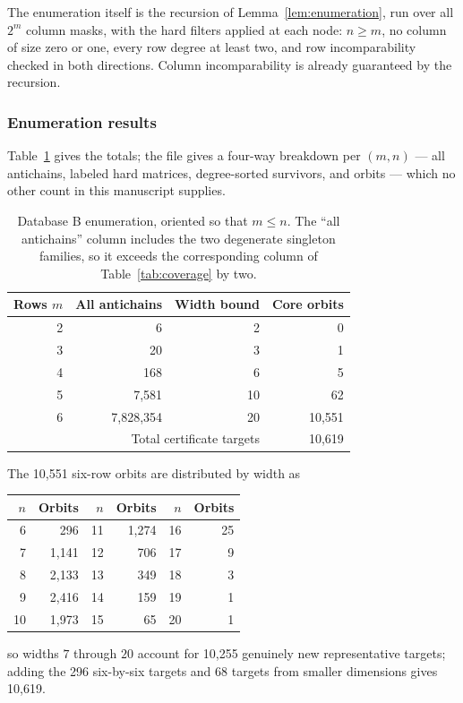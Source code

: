 \documentclass[11pt,letterpaper]{article}
\numberwithin{equation}{section}
\theoremstyle{definition}
\theoremstyle{remark}
\newcommand{\code}[1]{\texttt{\detokenize{#1}}}
\newcommand{\dbB}{\textsf{B}}
\begin{document}
The enumeration itself is the recursion of Lemma~\ref{lem:enumeration}, run
over all $2^m$ column masks, with the hard filters applied at each node:
$n\ge m$, no column of size zero or one, every row degree at least two, and
row incomparability checked in both directions. Column incomparability is
already guaranteed by the recursion.

\subsubsection{Enumeration results}
Table~\ref{tab:totals} gives the totals; the file \code{data/core\_counts.csv}
gives a four-way breakdown per $(m,n)$ --- all antichains, labeled hard
matrices, degree-sorted survivors, and orbits --- which no other count in this
manuscript supplies.

\begin{table}[htbp]
\centering
\caption{Database \dbB{} enumeration, oriented so that $m\le n$. The
``all antichains'' column includes the two degenerate singleton families,
so it exceeds the corresponding column of Table~\ref{tab:coverage} by two.}
\label{tab:totals}
\begin{tabular}{rrrr}
\toprule
Rows $m$ & All antichains & Width bound & Core orbits\\
\midrule
2 & 6 & 2 & 0\\
3 & 20 & 3 & 1\\
4 & 168 & 6 & 5\\
5 & 7,581 & 10 & 62\\
6 & 7,828,354 & 20 & 10,551\\
\midrule
\multicolumn{3}{r}{Total certificate targets} & 10,619\\
\bottomrule
\end{tabular}
\end{table}

The 10,551 six-row orbits are distributed by width as
\begin{center}
\begin{tabular}{rrrrrr}
\toprule
$n$ & Orbits & $n$ & Orbits & $n$ & Orbits\\
\midrule
6 & 296 & 11 & 1,274 & 16 & 25\\
7 & 1,141 & 12 & 706 & 17 & 9\\
8 & 2,133 & 13 & 349 & 18 & 3\\
9 & 2,416 & 14 & 159 & 19 & 1\\
10 & 1,973 & 15 & 65 & 20 & 1\\
\bottomrule
\end{tabular}
\end{center}
so widths $7$ through $20$ account for 10,255 genuinely new representative
targets; adding the 296 six-by-six targets and 68 targets from smaller
dimensions gives 10,619.
\end{document}
